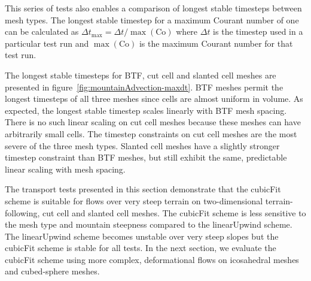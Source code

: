 This series of tests also enables a comparison of longest stable timesteps between mesh types.  The longest stable timestep for a maximum Courant number of one can be calculated as $\Delta t_\mathrm{max} = \Delta t / \max(\mathrm{Co})$ where $\Delta t$ is the timestep used in a particular test run and $\max(\mathrm{Co})$ is the maximum Courant number for that test run.

The longest stable timesteps for BTF, cut cell and slanted cell meshes are presented in figure~\ref{fig:mountainAdvection-maxdt}.  BTF meshes permit the longest timesteps of all three meshes since cells are almost uniform in volume.  As expected, the longest stable timestep scales linearly with BTF mesh spacing.
There is no such linear scaling on cut cell meshes because these meshes can have arbitrarily small cells.  The timestep constraints on cut cell meshes are the most severe of the three mesh types.  Slanted cell meshes have a slightly stronger timestep constraint than BTF meshes, but still exhibit the same, predictable linear scaling with mesh spacing.

The transport tests presented in this section demonstrate that the cubicFit scheme is suitable for flows over very steep terrain on two-dimensional terrain-following, cut cell and slanted cell meshes.  The cubicFit scheme is less sensitive to the mesh type and mountain steepness compared to the linearUpwind scheme.  The linearUpwind scheme becomes unstable over very steep slopes but the cubicFit scheme is stable for all tests.  In the next section, we evaluate the cubicFit scheme using more complex, deformational flows on icosahedral meshes and cubed-sphere meshes.
